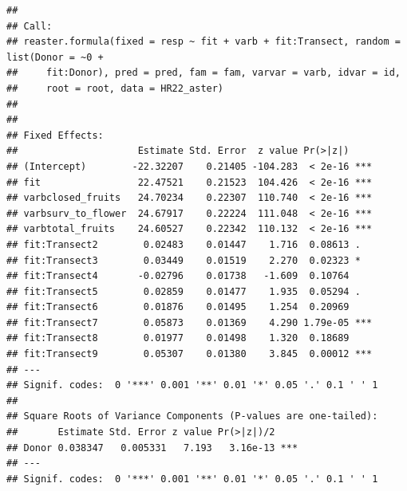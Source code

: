 \documentclass[
]{article}
\begin{document}
\begin{verbatim}
## 
## Call:
## reaster.formula(fixed = resp ~ fit + varb + fit:Transect, random = list(Donor = ~0 + 
##     fit:Donor), pred = pred, fam = fam, varvar = varb, idvar = id, 
##     root = root, data = HR22_aster)
## 
## 
## Fixed Effects:
##                     Estimate Std. Error  z value Pr(>|z|)    
## (Intercept)        -22.32207    0.21405 -104.283  < 2e-16 ***
## fit                 22.47521    0.21523  104.426  < 2e-16 ***
## varbclosed_fruits   24.70234    0.22307  110.740  < 2e-16 ***
## varbsurv_to_flower  24.67917    0.22224  111.048  < 2e-16 ***
## varbtotal_fruits    24.60527    0.22342  110.132  < 2e-16 ***
## fit:Transect2        0.02483    0.01447    1.716  0.08613 .  
## fit:Transect3        0.03449    0.01519    2.270  0.02323 *  
## fit:Transect4       -0.02796    0.01738   -1.609  0.10764    
## fit:Transect5        0.02859    0.01477    1.935  0.05294 .  
## fit:Transect6        0.01876    0.01495    1.254  0.20969    
## fit:Transect7        0.05873    0.01369    4.290 1.79e-05 ***
## fit:Transect8        0.01977    0.01498    1.320  0.18689    
## fit:Transect9        0.05307    0.01380    3.845  0.00012 ***
## ---
## Signif. codes:  0 '***' 0.001 '**' 0.01 '*' 0.05 '.' 0.1 ' ' 1
## 
## Square Roots of Variance Components (P-values are one-tailed):
##       Estimate Std. Error z value Pr(>|z|)/2    
## Donor 0.038347   0.005331   7.193   3.16e-13 ***
## ---
## Signif. codes:  0 '***' 0.001 '**' 0.01 '*' 0.05 '.' 0.1 ' ' 1
\end{verbatim}
\end{document}
